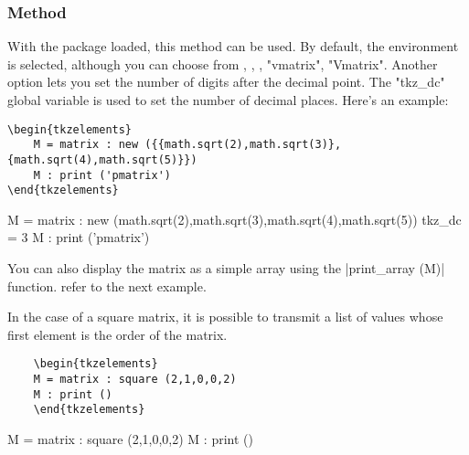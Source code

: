 
\subsubsection{Method  } %
\label{ssub:method_print}

With the  package loaded, this method can be used. By default, the  environment is selected, although you can choose from , , , "vmatrix", "Vmatrix". Another option lets you set the number of digits after the decimal point. The "tkz\_dc" global variable is used to set the number of decimal places. Here's an example:

\vspace{.5em}
\begin{Verbatim}
\begin{tkzelements}
    M = matrix : new ({{math.sqrt(2),math.sqrt(3)},{math.sqrt(4),math.sqrt(5)}})
    M : print ('pmatrix')
\end{tkzelements}
\end{Verbatim}

\begin{tkzelements}
  M = matrix : new ({{math.sqrt(2),math.sqrt(3)},{math.sqrt(4),math.sqrt(5)}})
  tkz_dc = 3
  M : print ('pmatrix')
\end{tkzelements}


\vspace{.5em}
You can also display the matrix as a simple array using the |print_array (M)| function. refer to the next example. 

In the case of a square matrix, it is possible to transmit a list of values whose first element is the order of the matrix.

\vspace{.5em}
\begin{minipage}{.5\textwidth}
  \begin{Verbatim}
    \begin{tkzelements}
    M = matrix : square (2,1,0,0,2)
    M : print () 
    \end{tkzelements}
  \end{Verbatim}
\end{minipage}
\begin{minipage}{.5\textwidth}
    \begin{tkzelements}
    M = matrix : square (2,1,0,0,2)
    M : print () 
    \end{tkzelements}
\end{minipage}

